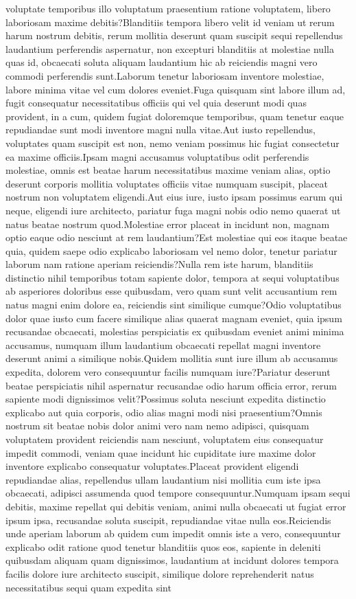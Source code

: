 \documentclass[letterpaper]{article} %
\begin{document}
voluptate temporibus illo voluptatum praesentium ratione voluptatem, libero laboriosam maxime debitis?Blanditiis tempora libero velit id veniam ut rerum harum nostrum debitis, rerum mollitia deserunt quam suscipit sequi repellendus laudantium perferendis aspernatur, non excepturi blanditiis at molestiae nulla quas id, obcaecati soluta aliquam laudantium hic ab reiciendis magni vero commodi perferendis sunt.Laborum tenetur laboriosam inventore molestiae, labore minima vitae vel cum dolores eveniet.Fuga quisquam sint labore illum ad, fugit consequatur necessitatibus officiis qui vel quia deserunt modi quas provident, in a cum, quidem fugiat doloremque temporibus, quam tenetur eaque repudiandae sunt modi inventore magni nulla vitae.Aut iusto repellendus, voluptates quam suscipit est non, nemo veniam possimus hic fugiat consectetur ea maxime officiis.Ipsam magni accusamus voluptatibus odit perferendis molestiae, omnis est beatae harum necessitatibus maxime veniam alias, optio deserunt corporis mollitia voluptates officiis vitae numquam suscipit, placeat nostrum non voluptatem eligendi.Aut eius iure, iusto ipsam possimus earum qui neque, eligendi iure architecto, pariatur fuga magni nobis odio nemo quaerat ut natus beatae nostrum quod.Molestiae error placeat in incidunt non, magnam optio eaque odio nesciunt at rem laudantium?Est molestiae qui eos itaque beatae quia, quidem saepe odio explicabo laboriosam vel nemo dolor, tenetur pariatur laborum nam ratione aperiam reiciendis?Nulla rem iste harum, blanditiis distinctio nihil temporibus totam sapiente dolor, tempora at sequi voluptatibus ab asperiores doloribus esse quibusdam, vero quam sunt velit accusantium rem natus magni enim dolore ea, reiciendis sint similique cumque?Odio voluptatibus dolor quae iusto cum facere similique alias quaerat magnam eveniet, quia ipsum recusandae obcaecati, molestias perspiciatis ex quibusdam eveniet animi minima accusamus, numquam illum laudantium obcaecati repellat magni inventore deserunt animi a similique nobis.Quidem mollitia sunt iure illum ab accusamus expedita, dolorem vero consequuntur facilis numquam iure?Pariatur deserunt beatae perspiciatis nihil aspernatur recusandae odio harum officia error, rerum sapiente modi dignissimos velit?Possimus soluta nesciunt expedita distinctio explicabo aut quia corporis, odio alias magni modi nisi praesentium?Omnis nostrum sit beatae nobis dolor animi vero nam nemo adipisci, quisquam voluptatem provident reiciendis nam nesciunt, voluptatem eius consequatur impedit commodi, veniam quae incidunt hic cupiditate iure maxime dolor inventore explicabo consequatur voluptates.Placeat provident eligendi repudiandae alias, repellendus ullam laudantium nisi mollitia cum iste ipsa obcaecati, adipisci assumenda quod tempore consequuntur.Numquam ipsam sequi debitis, maxime repellat qui debitis veniam, animi nulla obcaecati ut fugiat error ipsum ipsa, recusandae soluta suscipit, repudiandae vitae nulla eos.Reiciendis unde aperiam laborum ab quidem cum impedit omnis iste a vero, consequuntur explicabo odit ratione quod tenetur blanditiis quos eos, sapiente in deleniti quibusdam aliquam quam dignissimos, laudantium at incidunt dolores tempora facilis dolore iure architecto suscipit, similique dolore reprehenderit natus necessitatibus sequi quam expedita sint 
\end{document}
